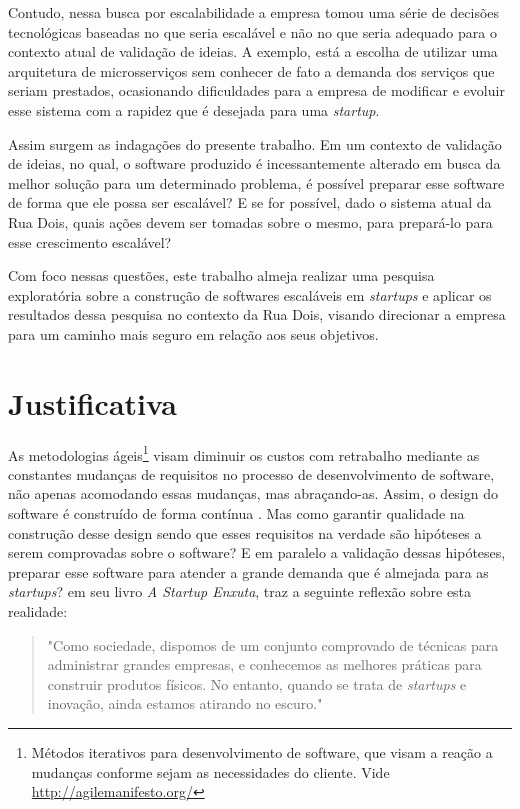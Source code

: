 Contudo, nessa busca por escalabilidade a empresa tomou uma série de decisões
tecnológicas baseadas no que seria escalável e não no que seria adequado para
o contexto atual de validação de ideias. A exemplo, está a escolha de utilizar
uma arquitetura de microsserviços sem conhecer de fato a demanda dos serviços
que seriam prestados, ocasionando dificuldades para a empresa de
modificar e evoluir esse sistema com a rapidez que é desejada para uma
\textit{startup}.

Assim surgem as indagações do presente trabalho. Em um contexto de validação
de ideias, no qual, o software produzido é incessantemente alterado em busca
da melhor solução para um determinado problema, é possível preparar esse
software de forma que ele possa ser escalável? E se for possível, dado o sistema
atual da Rua Dois, quais ações devem ser tomadas sobre o mesmo, para prepará-lo
para esse crescimento escalável?

Com foco nessas questões, este trabalho almeja realizar uma pesquisa exploratória
sobre a construção de softwares escaláveis em \textit{startups} e aplicar
os resultados dessa pesquisa no contexto da Rua Dois, visando direcionar a
empresa para um caminho mais seguro em relação aos seus objetivos.

\section{Justificativa}

As metodologias ágeis\footnote{Métodos iterativos para desenvolvimento de software,
que visam a reação a mudanças conforme sejam as necessidades do cliente. Vide
\url{http://agilemanifesto.org/}} visam diminuir os custos com retrabalho mediante as
constantes mudanças de requisitos no processo de desenvolvimento de software,
não apenas acomodando essas mudanças, mas abraçando-as. Assim, o design do
software é construído de forma contínua \cite{AgileSoftwareInnovation}.
Mas como garantir qualidade na construção desse design sendo que esses requisitos
na verdade são hipóteses a serem comprovadas sobre o software? E em paralelo
a validação dessas hipóteses, preparar esse software para atender a grande
demanda que é almejada para as \textit{startups}? 
em seu livro \textit{A Startup Enxuta}, traz a seguinte reflexão sobre esta
realidade:

  \begin{quotation}
    "Como sociedade, dispomos de um conjunto comprovado de técnicas para
    administrar grandes empresas, e conhecemos as melhores práticas para
    construir produtos físicos. No entanto, quando se trata de \textit{startups}
    e inovação, ainda estamos atirando no escuro."
  \end{quotation}

